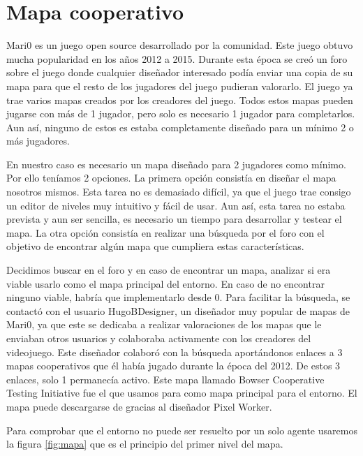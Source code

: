 \section{Mapa cooperativo}
Mari0 es un juego open source desarrollado por la comunidad. Este juego obtuvo mucha popularidad en los años 2012 a 2015. Durante esta época se creó un foro sobre el juego donde cualquier diseñador interesado podía enviar una copia de su mapa para que el resto de los jugadores del juego pudieran valorarlo. El juego ya trae varios mapas creados por los creadores del juego. Todos estos mapas pueden jugarse con más de 1 jugador, pero solo es necesario 1 jugador para completarlos. Aun así, ninguno de estos es estaba completamente diseñado para un mínimo 2 o más jugadores.

En nuestro caso es necesario un mapa diseñado para 2 jugadores como mínimo. Por ello teníamos 2 opciones. La primera opción consistía en diseñar el mapa nosotros mismos. Esta tarea no es demasiado difícil, ya que el juego trae consigo un editor de niveles muy intuitivo y fácil de usar. Aun así, esta tarea no estaba prevista y aun ser sencilla, es necesario un tiempo para desarrollar y testear el mapa. La otra opción consistía en realizar una búsqueda por el foro \cite{mari0-forum} con el objetivo de encontrar algún mapa que cumpliera estas características. 

Decidimos buscar en el foro y en caso de encontrar un mapa, analizar si era viable usarlo como el mapa principal del entorno. En caso de no encontrar ninguno viable, habría que implementarlo desde 0. Para facilitar la búsqueda, se contactó con el usuario HugoBDesigner, un diseñador muy popular de mapas de Mari0, ya que este se dedicaba a realizar valoraciones de los mapas que le enviaban otros usuarios y colaboraba activamente con los creadores del videojuego. Este diseñador colaboró con la búsqueda aportándonos enlaces a 3 mapas cooperativos que él había jugado durante la época del 2012. De estos 3 enlaces, solo 1 permanecía activo. Este mapa llamado Bowser Cooperative Testing Initiative fue el que usamos para como mapa principal para el entorno. El mapa puede descargarse de \cite {mari0-mapa} gracias al diseñador Pixel Worker. 

Para comprobar que el entorno no puede ser resuelto por un solo agente usaremos la figura \ref {fig:mapa} que es el principio del primer nivel del mapa.

